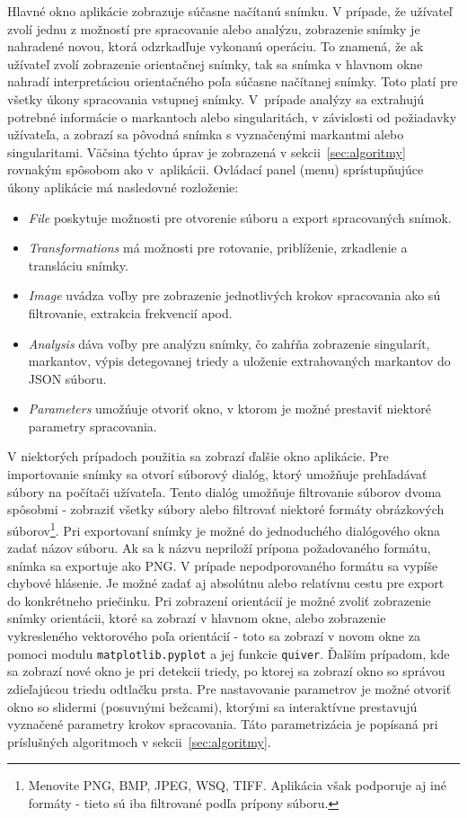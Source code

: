   Hlavné okno aplikácie zobrazuje súčasne načítanú snímku. V prípade, že užívateľ zvolí jednu z možností pre spracovanie alebo analýzu, zobrazenie snímky je
  nahradené novou, ktorá odzrkadľuje vykonanú operáciu. To znamená, že ak užívateľ zvolí zobrazenie orientačnej snímky, tak sa snímka v hlavnom okne nahradí
  interpretáciou orientačného poľa súčasne načítanej snímky. Toto platí pre všetky úkony spracovania vstupnej snímky. V~prípade analýzy sa extrahujú potrebné
  informácie o markantoch alebo singularitách, v závislosti od požiadavky užívateľa, a zobrazí sa pôvodná snímka s vyznačenými markantmi alebo singularitami.
  Väčsina týchto úprav je zobrazená v sekcii~{\ref{sec:algoritmy}} rovnakým spôsobom ako v~aplikácii. Ovládací panel (menu) sprístupňujúce úkony aplikácie má
  nasledovné rozloženie:
  \begin{itemize}
    \item \emph{File} poskytuje možnosti pre otvorenie súboru a export spracovaných snímok.
    \item \emph{Transformations} má možnosti pre rotovanie, priblíženie, zrkadlenie a transláciu snímky.
    \item \emph{Image} uvádza voľby pre zobrazenie jednotlivých krokov spracovania ako sú filtrovanie, extrakcia frekvencií apod.
    \item \emph{Analysis} dáva voľby pre analýzu snímky, čo zahŕňa zobrazenie singularít, markantov, výpis detegovanej triedy a uloženie extrahovaných
          markantov do JSON súboru.
    \item \emph{Parameters} umožńuje otvoriť okno, v ktorom je možné prestaviť niektoré parametry spracovania.
  \end{itemize}

  V niektorých prípadoch použitia sa zobrazí ďalšie okno aplikácie. Pre importovanie snímky sa otvorí súborový dialóg, ktorý umožňuje prehľadávať súbory
  na počítači užívateľa. Tento dialóg umožňuje filtrovanie súborov dvoma spôsobmi - zobraziť všetky súbory alebo filtrovať niektoré formáty obrázkových
  súborov\footnote{Menovite PNG, BMP, JPEG, WSQ, TIFF. Aplikácia však podporuje aj iné formáty - tieto sú iba filtrované podľa prípony súboru.}.
  Pri exportovaní snímky je možné do jednoduchého dialógového okna zadať názov súboru. Ak sa k názvu nepriloží prípona požadovaného formátu, snímka sa
  exportuje ako PNG. V prípade nepodporovaného formátu sa vypíše chybové hlásenie. Je možné zadať aj absolútnu alebo relatívnu cestu pre export do konkrétneho
  priečinku. Pri zobrazení orientácií je možné zvoliť zobrazenie snímky orientácii, ktoré sa zobrazí v hlavnom okne, alebo zobrazenie vykresleného vektorového
  poľa orientácií - toto sa zobrazí v novom okne za pomoci modulu \texttt{matplotlib.pyplot} a jej funkcie \texttt{quiver}. Ďalším prípadom, kde sa zobrazí nové
  okno je pri detekcii triedy, po ktorej sa zobrazí okno so správou zdieľajúcou triedu odtlačku prsta. Pre nastavovanie parametrov je možné otvoriť okno
  so slidermi (posuvnými bežcami), ktorými sa interaktívne prestavujú vyznačené parametry krokov spracovania. Táto parametrizácia je popísaná pri príslušných
  algoritmoch v sekcii~{\ref{sec:algoritmy}}.

